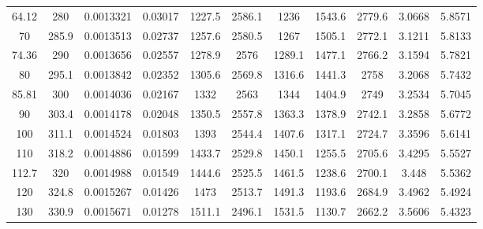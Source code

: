 \begin{longtable}{ccccccccccc}
64.12    & 280         & 0.0013321              & 0.03017             & 1227.5                 & 2586.1              & 1236            & 1543.6       & 2779.6       & 3.0668         & 5.8571      \\
70       & 285.9       & 0.0013513              & 0.02737             & 1257.6                 & 2580.5              & 1267            & 1505.1       & 2772.1       & 3.1211         & 5.8133      \\
74.36    & 290         & 0.0013656              & 0.02557             & 1278.9                 & 2576                & 1289.1          & 1477.1       & 2766.2       & 3.1594         & 5.7821      \\
80       & 295.1       & 0.0013842              & 0.02352             & 1305.6                 & 2569.8              & 1316.6          & 1441.3       & 2758         & 3.2068         & 5.7432      \\
85.81    & 300         & 0.0014036              & 0.02167             & 1332                   & 2563                & 1344            & 1404.9       & 2749         & 3.2534         & 5.7045      \\
90       & 303.4       & 0.0014178              & 0.02048             & 1350.5                 & 2557.8              & 1363.3          & 1378.9       & 2742.1       & 3.2858         & 5.6772      \\
100      & 311.1       & 0.0014524              & 0.01803             & 1393                   & 2544.4              & 1407.6          & 1317.1       & 2724.7       & 3.3596         & 5.6141      \\
110      & 318.2       & 0.0014886              & 0.01599             & 1433.7                 & 2529.8              & 1450.1          & 1255.5       & 2705.6       & 3.4295         & 5.5527      \\
112.7    & 320         & 0.0014988              & 0.01549             & 1444.6                 & 2525.5              & 1461.5          & 1238.6       & 2700.1       & 3.448          & 5.5362      \\
120      & 324.8       & 0.0015267              & 0.01426             & 1473                   & 2513.7              & 1491.3          & 1193.6       & 2684.9       & 3.4962         & 5.4924      \\
130      & 330.9       & 0.0015671              & 0.01278             & 1511.1                 & 2496.1              & 1531.5          & 1130.7       & 2662.2       & 3.5606         & 5.4323      \\

\end{longtable}
